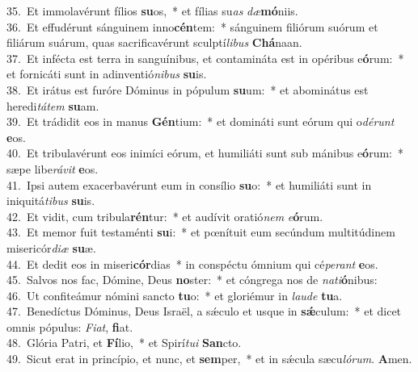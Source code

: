 {35.~}Et immolavérunt fílios \textbf{su}os,~* et fílias su\textit{as} \textit{dæ}\textbf{mó}niis.\\
{36.~}Et effudérunt sánguinem inno\textbf{cén}tem:~* sánguinem filiórum suórum et filiárum suárum, quas sacrificavérunt sculptí\textit{li}\textit{bus} \textbf{Chá}naan.\\
{37.~}Et infécta est terra in sanguínibus, et contamináta est in opéribus e\textbf{ó}rum:~* et fornicáti sunt in adinventió\textit{ni}\textit{bus} \textbf{su}is.\\
{38.~}Et irátus est furóre Dóminus in pópulum \textbf{su}um:~* et abominátus est heredi\textit{tá}\textit{tem} \textbf{su}am.\\
{39.~}Et trádidit eos in manus \textbf{Gén}tium:~* et domináti sunt eórum qui o\textit{dé}\textit{runt} \textbf{e}os.\\
{40.~}Et tribulavérunt eos inimíci eórum, et humiliáti sunt sub mánibus e\textbf{ó}rum:~* sæpe libe\textit{rá}\textit{vit} \textbf{e}os.\\
{41.~}Ipsi autem exacerbavérunt eum in consílio \textbf{su}o:~* et humiliáti sunt in iniquitá\textit{ti}\textit{bus} \textbf{su}is.\\
{42.~}Et vidit, cum tribula\textbf{rén}tur:~* et audívit oratió\textit{nem} \textit{e}\textbf{ó}rum.\\
{43.~}Et memor fuit testaménti \textbf{su}i:~* et pœnítuit eum secúndum multitúdinem misericór\textit{di}\textit{æ} \textbf{su}æ.\\
{44.~}Et dedit eos in miseri\textbf{cór}dias~* in conspéctu ómnium qui cé\textit{pe}\textit{rant} \textbf{e}os.\\
{45.~}Salvos nos fac, Dómine, Deus \textbf{no}ster:~* et cóngrega nos de \textit{na}\textit{ti}\textbf{ó}nibus:\\
{46.~}Ut confiteámur nómini sancto \textbf{tu}o:~* et gloriémur in \textit{lau}\textit{de} \textbf{tu}a.\\
{47.~}Benedíctus Dóminus, Deus Israël, a sǽculo et usque in \textbf{sǽ}culum:~* et dicet omnis pópulus: \textit{Fi}\textit{at}, \textbf{fi}at.\\
{48.~}Glória Patri, et \textbf{Fí}lio,~* et Spirí\textit{tu}\textit{i} \textbf{San}cto.\\
{49.~}Sicut erat in princípio, et nunc, et \textbf{sem}per,~* et in sǽcula sæcu\textit{ló}\textit{rum}. \textbf{A}men.\\
